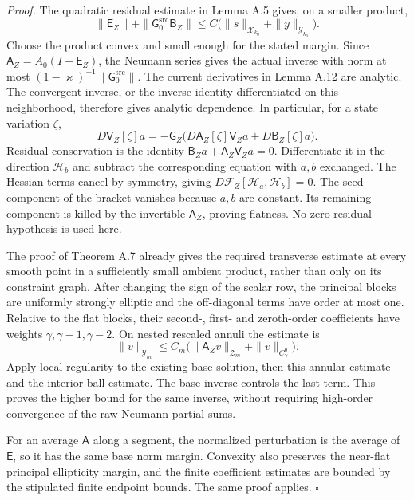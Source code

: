 \documentclass[
  english,
  11pt,
  reqno]{amsart}
\begin{document}
\emph{Proof.} The quadratic residual estimate in Lemma A.5 gives, on a
smaller product, \[
\|\mathsf E_Z\|
+\|\mathsf G_0^{\mathrm{src}}\mathsf B_Z\|
\le C\bigl(\|s\|_{\mathcal X_{k_0}}+\|y\|_{\mathcal Y_{k_0}}\bigr).
\] Choose the product convex and small enough for the stated margin.
Since \(\mathsf A_Z=A_0(I+\mathsf E_Z)\), the Neumann series gives the
actual inverse with norm at most
\((1-\varkappa)^{-1}\|\mathsf G_0^{\mathrm{src}}\|\). The current
derivatives in Lemma A.12 are analytic. The convergent inverse, or the
inverse identity differentiated on this neighborhood, therefore gives
analytic dependence. In particular, for a state variation \(\zeta\),%
 \[
D\mathsf V_Z[\zeta]a
=-\mathsf G_Z\bigl(D\mathsf A_Z[\zeta]\mathsf V_Za
                   +D\mathsf B_Z[\zeta]a\bigr).
\] Residual conservation is the identity
\(\mathsf B_Za+\mathsf A_Z\mathsf V_Za=0\). Differentiate it in the
direction \(\mathscr H_b\) and subtract the corresponding equation with
\(a,b\) exchanged. The Hessian terms cancel by symmetry, giving
\(D\mathcal F_Z[\mathscr H_a,\mathscr H_b]=0\). The seed component of
the bracket vanishes because \(a,b\) are constant. Its remaining
component is killed by the invertible \(\mathsf A_Z\), proving flatness.
No zero-residual hypothesis is used here.

The proof of Theorem A.7 already gives the required transverse estimate
at every smooth point in a sufficiently small ambient product, rather
than only on its constraint graph. After changing the sign of the scalar
row, the principal blocks are uniformly strongly elliptic and the
off-diagonal terms have order at most one. Relative to the flat blocks,
their second-, first- and zeroth-order coefficients have weights
\(\gamma,\gamma-1,\gamma-2\). On nested rescaled annuli the estimate is%
 \[
\|v\|_{\mathcal Y_m}
\le C_m\bigl(\|\mathsf A_Zv\|_{\mathcal Z_m}
                  +\|v\|_{C^0_\gamma}\bigr).
\] Apply local regularity to the existing base solution, then this
annular estimate and the interior-ball estimate. The base inverse
controls the last term. This proves the higher bound for the same
inverse, without requiring high-order convergence of the raw Neumann
partial sums.

For an average \(\overline{\mathsf A}\) along a segment, the normalized
perturbation is the average of \(\mathsf E\), so it has the same base
norm margin. Convexity also preserves the near-flat principal
ellipticity margin, and the finite coefficient estimates are bounded by
the stipulated finite endpoint bounds. The same proof applies.
\hfill\(\square\)
\end{document}
